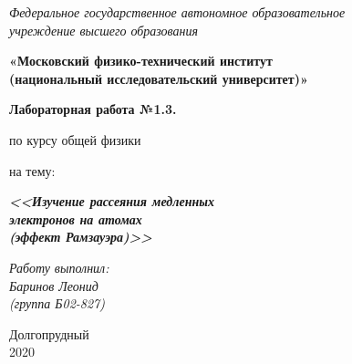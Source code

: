 \thispagestyle{empty}
\begin{center}
    \textit{Федеральное государственное автономное образовательное\\ учреждение высшего образования }

    \vspace{0.5ex}

        \textbf{«Московский физико-технический институт\\ (национальный исследовательский университет)»}
\end{center}

\vspace{10ex}

\begin{center}
    \vspace{13ex}

    \textbf{Лабораторная работа №1.3.}

    \vspace{1ex}

    по курсу общей физики

    на тему:

    \textbf{\textit{<<Изучение рассеяния медленных \\ электронов на
    атомах \\ (эффект Рамзауэра)>>}}

    \vspace{30ex}

    \begin{flushright}
        \noindent
        \textit{Работу выполнил:}\\  
        \textit{Баринов Леонид \\(группа Б02-827)}
    \end{flushright}
    \vfill
    Долгопрудный \\2020
\newpage
\setcounter{page}{1}
\fancyhead[R]{\nouppercase{\leftmark}}	
\end{center}
